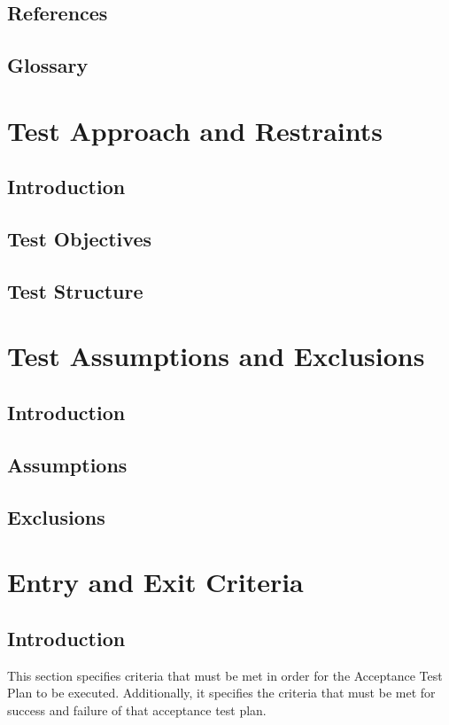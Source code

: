 \documentclass{article}
\begin{document}
\subsection{References}
\subsection{Glossary}

\section{Test Approach and Restraints} %

\subsection{Introduction}
\subsection{Test Objectives}
\subsection{Test Structure}

\section{Test Assumptions and Exclusions} %

\subsection{Introduction}
\subsection{Assumptions}
\subsection{Exclusions}

\section{Entry and Exit Criteria} 

\subsection{Introduction}
	This section specifies criteria that must be met in order for the Acceptance 
	Test Plan to be executed. Additionally, it specifies the criteria that must 
	be met for success and failure of that acceptance test plan.
\end{document}
